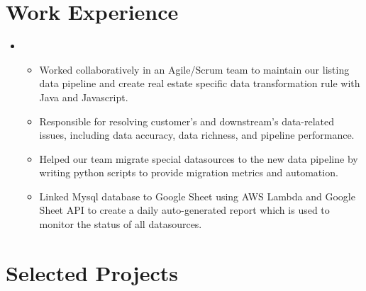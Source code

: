 \documentclass[12pt,a4paper,sans]{moderncv}        %
\begin{document}
\vspace{8pt}

\section{Work Experience}

\begin{itemize}
\vspace{6pt}

\item{

\begin{itemize}
\item{Worked collaboratively in an Agile/Scrum team to maintain our listing data pipeline and create real estate specific data transformation rule with Java and Javascript.}
\vspace{3pt}
\item{Responsible for resolving customer's and downstream's data-related issues, including data accuracy, data richness, and pipeline performance.
}
\vspace{3pt}
\item{Helped our team migrate special datasources to the new data pipeline by writing python scripts to provide migration metrics and automation.}
\vspace{3pt}
\item{Linked Mysql database to Google Sheet using AWS Lambda and Google Sheet API to create a daily auto-generated report which is used to monitor the status of all datasources.}

\end{itemize}}
\end{itemize}


\vspace{8pt}

\section{Selected Projects}

\vspace{6pt}
\end{document}
